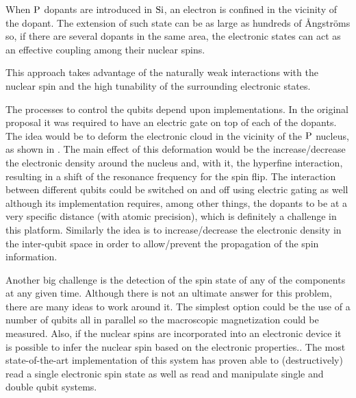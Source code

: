 When $\ce{P}$ dopants are introduced in $\ce{Si}$, an electron is confined in the vicinity of the dopant. The extension of such state can be as large as hundreds of Ångströms so, if there are several dopants in the same area, the electronic states can act as an effective coupling among their nuclear spins\cite{Slichter1990}.

This approach takes advantage of the naturally weak interactions with the nuclear spin and the high tunability of the surrounding electronic states.


The processes to control the qubits depend upon implementations. In the original proposal it was required to have an electric gate on top of each of the dopants. The idea would be to deform the electronic cloud in the vicinity of the $\ce{P}$ nucleus, as shown in . The main effect of this deformation would be the increase/decrease the electronic density around the nucleus and, with it, the hyperfine interaction, resulting in a shift of the resonance frequency for the spin flip.
The interaction between different qubits could be switched on and off using electric gating as well although its implementation requires, among other things, the dopants to be at a very specific distance (with atomic precision), which is definitely a challenge in this platform. Similarly the idea is to increase/decrease the electronic density in the inter-qubit space in order to allow/prevent the propagation of the spin information.


Another big challenge is the detection of the spin state of any of the components at any given time. Although there is not an ultimate answer for this problem, there are many ideas to work around it. The simplest option could be the use of a number of qubits all in parallel so the macroscopic magnetization could be measured. Also, if the nuclear spins are incorporated into an electronic device it is possible to infer the nuclear spin based on the electronic properties.\cite{Kane1992,Wald1994,Stich1996,Dixon1997,Dobers1988,Stegner2006}. The most state-of-the-art implementation of this system has proven able to (destructively) read a single electronic spin state as well as read and manipulate single and double qubit systems.\cite{Morello2010,Pla2012,Dehollain2014}

